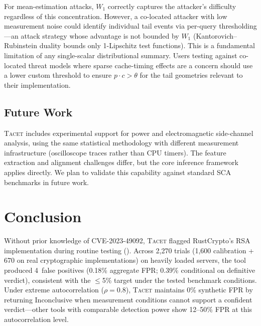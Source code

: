 \documentclass[letterpaper,twocolumn,10pt]{article}
\newcommand{\tacet}{\textsc{Tacet}\xspace}
\begin{document}
For mean-estimation attacks, $W_1$ correctly captures the attacker's difficulty
regardless of this concentration. However, a co-located attacker with low
measurement noise could identify individual tail events via per-query
thresholding---an attack strategy whose advantage is not bounded by $W_1$
(Kantorovich--Rubinstein duality bounds only 1-Lipschitz test functions). This is
a fundamental limitation of any single-scalar distributional summary. Users
testing against co-located threat models where sparse cache-timing effects are a
concern should use a lower custom threshold to ensure $p \cdot c > \theta$ for
the tail geometries relevant to their implementation.

\subsection{Future Work}
\label{sec:discussion:future}

\tacet includes experimental support for power and electromagnetic side-channel
analysis, using the same statistical methodology with different measurement
infrastructure (oscilloscope traces rather than CPU timers). The feature
extraction and alignment challenges differ, but the core inference framework
applies directly. We plan to validate this capability against standard SCA
benchmarks in future work.

\section{Conclusion}
\label{sec:conclusion}

Without prior knowledge of CVE-2023-49092, \tacet flagged RustCrypto's RSA
implementation during routine testing ().
Across 2{,}270 trials (1{,}600 calibration + 670 on real cryptographic
implementations) on heavily loaded servers, the tool produced
4~false positives (0.18\% aggregate FPR; 0.39\% conditional on definitive
verdict), consistent with the $\leq$5\% target under the tested benchmark
conditions. Under extreme autocorrelation ($\rho = 0.8$), \tacet maintains 0\%
synthetic FPR by returning Inconclusive when measurement conditions
cannot support a confident verdict---other tools with comparable
detection power show 12--50\% FPR at this autocorrelation level.
\end{document}
